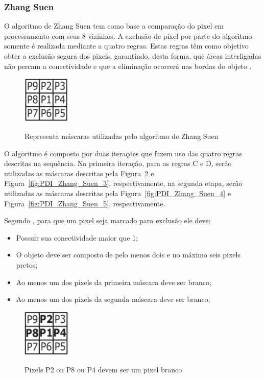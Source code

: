\documentclass[12pt,oneside,a4paper,english,french,spanish,brazil,]{abntex2}
\begin{document}

\subsubsection{Zhang Suen}

O algoritmo de Zhang Suen \cite{zhang:1984} tem como base a comparação do pixel em processamento com seus 8 vizinhos. A exclusão de pixel por parte do algoritmo somente é realizada mediante a quatro regras. Estas regras têm como objetivo obter a exclusão segura dos pixels, garantindo, desta forma, que áreas interligadas não percam a conectividade e que a eliminação ocorrerá nas bordas do objeto \cite{guilherme:2007}.

\begin{figure}[ht]
\centering
\caption{Representa máscaras utilizadas pelo algoritmo de Zhang Suen}
\includegraphics[width=0.2\textwidth]{imagens/PDI_Zhang_Suen_1.PNG}
\label{fig:PDI_Zhang_Suen_1}
\end{figure}

O algoritmo é composto por duas iterações que fazem uso das quatro regras descritas na sequência. Na primeira iteração, para as regras C e D, serão utilizadas as máscaras descritas pela Figura~\ref{fig:PDI_Zhang_Suen_2} e Figura~\ref{fig:PDI_Zhang_Suen_3}, respectivamente, na segunda etapa, serão utilizadas as máscaras descritas pela Figura~\ref{fig:PDI_Zhang_Suen_4} e Figura~\ref{fig:PDI_Zhang_Suen_5}, respectivamente.

Segundo \citet{guilherme:2007}, para que um pixel seja marcado para exclusão ele deve:
\begin{itemize}
\item Possuir sua conectividade maior que 1;
\item O objeto deve ser composto de pelo menos dois e no máximo seis pixels pretos;
\item Ao menos um dos pixels da primeira máscara deve ser branco;
\item Ao menos um dos pixels da segunda máscara deve ser branco;
\end{itemize}

\begin{figure}[ht]
\centering
\caption{Pixels P2 ou P8 ou P4 devem ser um pixel branco}
\includegraphics[width=0.2\textwidth]{imagens/PDI_Zhang_Suen_2.PNG}
\label{fig:PDI_Zhang_Suen_2}
\end{figure}
\end{document}
